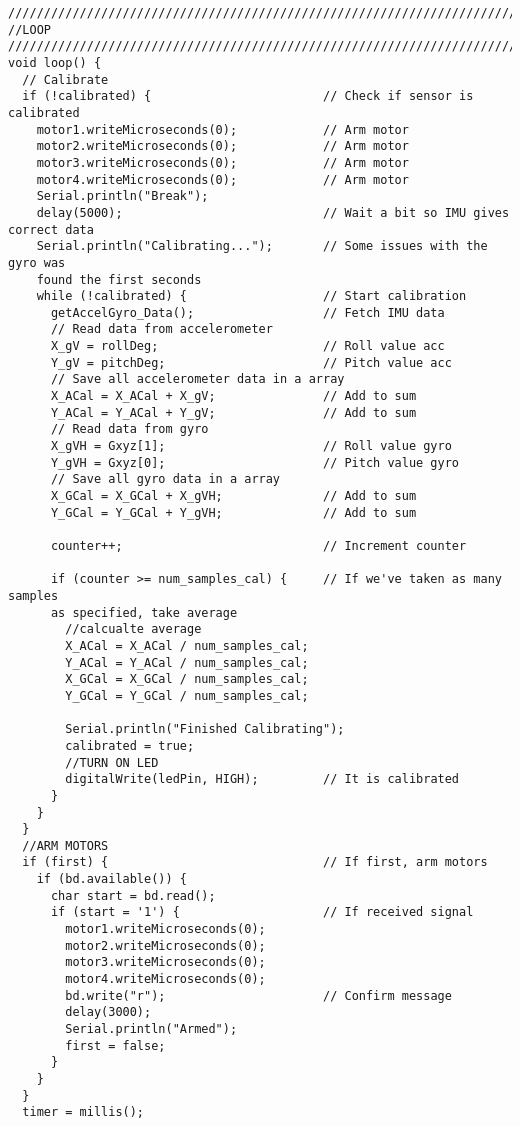 \begin{lstlisting}
//////////////////////////////////////////////////////////////////////////////
//LOOP
//////////////////////////////////////////////////////////////////////////////
void loop() {
  // Calibrate
  if (!calibrated) {                        // Check if sensor is calibrated
    motor1.writeMicroseconds(0);            // Arm motor
    motor2.writeMicroseconds(0);            // Arm motor
    motor3.writeMicroseconds(0);            // Arm motor
    motor4.writeMicroseconds(0);            // Arm motor
    Serial.println("Break");                
    delay(5000);                            // Wait a bit so IMU gives correct data
    Serial.println("Calibrating...");       // Some issues with the gyro was 
    found the first seconds
    while (!calibrated) {                   // Start calibration
      getAccelGyro_Data();                  // Fetch IMU data
      // Read data from accelerometer
      X_gV = rollDeg;                       // Roll value acc
      Y_gV = pitchDeg;                      // Pitch value acc
      // Save all accelerometer data in a array
      X_ACal = X_ACal + X_gV;               // Add to sum
      Y_ACal = Y_ACal + Y_gV;               // Add to sum
      // Read data from gyro
      X_gVH = Gxyz[1];                      // Roll value gyro
      Y_gVH = Gxyz[0];                      // Pitch value gyro
      // Save all gyro data in a array
      X_GCal = X_GCal + X_gVH;              // Add to sum
      Y_GCal = Y_GCal + Y_gVH;              // Add to sum
 
      counter++;                            // Increment counter
 
      if (counter >= num_samples_cal) {     // If we've taken as many samples 
      as specified, take average
        //calcualte average
        X_ACal = X_ACal / num_samples_cal;
        Y_ACal = Y_ACal / num_samples_cal;
        X_GCal = X_GCal / num_samples_cal;
        Y_GCal = Y_GCal / num_samples_cal;
 
        Serial.println("Finished Calibrating");
        calibrated = true;
        //TURN ON LED
        digitalWrite(ledPin, HIGH);         // It is calibrated
      }
    }
  }
  //ARM MOTORS
  if (first) {                              // If first, arm motors
    if (bd.available()) {
      char start = bd.read();
      if (start = '1') {                    // If received signal
        motor1.writeMicroseconds(0);
        motor2.writeMicroseconds(0);
        motor3.writeMicroseconds(0);
        motor4.writeMicroseconds(0);
        bd.write("r");                      // Confirm message
        delay(3000);
        Serial.println("Armed");
        first = false;
      }
    }
  }
  timer = millis();


\end{lstlisting}
